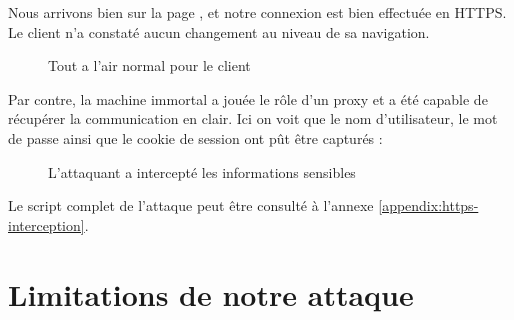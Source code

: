 Nous arrivons bien sur la page , et notre connexion est bien effectuée en HTTPS. Le client n'a constaté aucun changement au niveau de sa navigation.

\begin{figure}[H]
  \caption{Tout a l'air normal pour le client}
\end{figure}

Par contre, la machine immortal a jouée le rôle d'un proxy et a été capable de récupérer la communication en clair. Ici on voit que le nom d'utilisateur, le mot de passe ainsi que le cookie de session ont pût être capturés :

\begin{figure}[H]
  \caption{L'attaquant a intercepté les informations sensibles}
\end{figure}

Le script complet de l'attaque peut être consulté à l'annexe \ref{appendix:https-interception}.

\section{Limitations de notre attaque}

